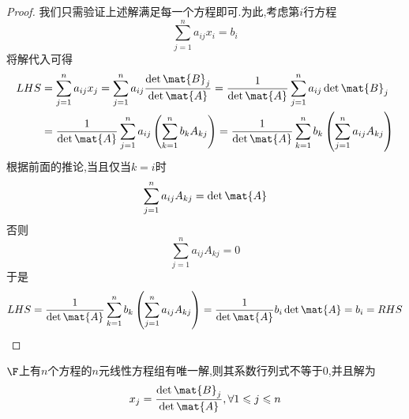 \documentclass{ctexart}
\begin{document}
\begin{proof}
    我们只需验证上述解满足每一个方程即可.为此,考虑第$i$行方程
    \[\sum_{j=1}^{n}a_{ij}x_i=b_i\]
    将解代入可得
    \[\begin{aligned}
        LHS
        &= \sum_{j=1}^{n}a_{ij}x_j = \sum_{j=1}^{n}a_{ij}\dfrac{\det\mat{B}_j}{\det\mat{A}} = \dfrac{1}{\det\mat{A}}\sum_{j=1}^{n}a_{ij}\det\mat{B}_j \\
        &= \dfrac{1}{\det\mat{A}}\sum_{j=1}^{n}a_{ij}\left(\sum_{k=1}^{n}b_kA_{kj}\right) = \dfrac{1}{\det\mat{A}}\sum_{k=1}^{n}b_k\left(\sum_{j=1}^{n}a_{ij}A_{kj}\right)
    \end{aligned}\]
    根据前面的推论,当且仅当$k=i$时
    \[\sum_{j=1}^{n}a_{ij}A_{kj}=\det\mat{A}\]
    否则
    \[\sum_{j=1}^{n}a_{ij}A_{kj}=0\]
    于是
    \[LHS=\dfrac{1}{\det\mat{A}}\sum_{k=1}^{n}b_k\left(\sum_{j=1}^{n}a_{ij}A_{kj}\right)=\dfrac{1}{\det\mat{A}}b_i\det\mat{A}=b_i=RHS\]
\end{proof}
\begin{theorem}[Cramer法则]
    $\F$上有$n$个方程的$n$元线性方程组有唯一解,则其系数行列式不等于$0$,并且解为
    \[x_j=\dfrac{\det\mat{B}_j}{\det\mat{A}},\forall 1\leqslant j\leqslant n\]
\end{theorem}
\end{document}
